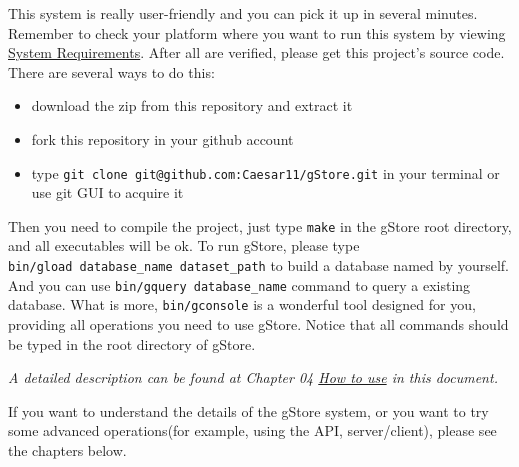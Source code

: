 \documentclass[titlepage, a4paper, 12pt]{article}
\begin{document}

This system is really user-friendly and you can pick it up in several minutes. Remember to check your platform where you want to run this system by viewing \hyperref[chapter01]{System Requirements}. After all are verified, please get this project's source code. There are several ways to do this:

\begin{itemize}
\item
  download the zip from this repository and extract it
\item
  fork this repository in your github account
\item
  type \texttt{git\ clone\ git@github.com:Caesar11/gStore.git} in your
  terminal or use git GUI to acquire it
\end{itemize}

Then you need to compile the project, just type \texttt{make} in the gStore root directory, and all executables will be ok. To run gStore, please type \texttt{bin/gload\ database\_name\ dataset\_path} to build a database named by yourself. And you can use \texttt{bin/gquery\ database\_name} command to query a existing database. What is more, \texttt{bin/gconsole} is a wonderful tool designed for you, providing all operations you need to use gStore.
Notice that all commands should be typed in the root directory of gStore.

\emph{A detailed description can be found at Chapter 04
\hyperref[chapter04]{How to use} in this document.}


If you want to understand the details of the gStore system, or you want to try some advanced operations(for example, using the API, server/client), please see the chapters below.
\end{document}
